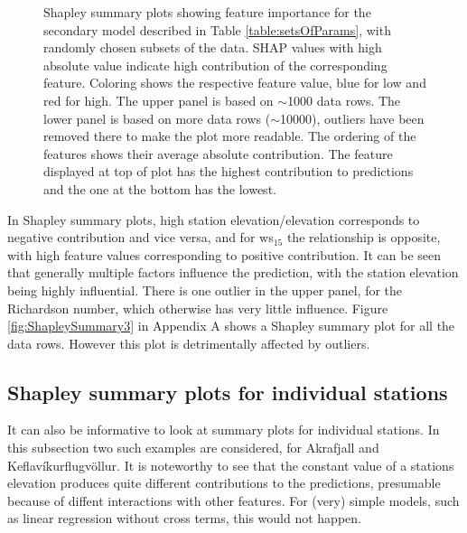 \begin{figure}
\begin{subfigure}{0.85\textwidth}
    \label{fig:ShapleySummaryLargerSet}
  \end{subfigure}
  \caption[Shapley summary plots]{Shapley summary plots showing feature importance for the secondary model described in Table \ref{table:setsOfParams}, with randomly chosen subsets of the data. SHAP values with high absolute value indicate high contribution of the corresponding feature. Coloring shows the respective feature value, blue for low and red for high. The upper panel is based on $\sim$1000 data rows. The lower panel is based on more data rows ($\sim$10000), outliers have been removed there to make the plot more readable. The ordering of the features shows their average absolute contribution. The feature displayed at top of plot has the highest contribution to predictions and the one at the bottom has the lowest.}
  \label{fig:ShapleySummary}
\end{figure}

In Shapley summary plots, high station elevation/elevation corresponds to negative contribution and vice versa, and for ws$_{15}$ the relationship is opposite, with high feature values corresponding to positive contribution. It can be seen that generally multiple factors influence the prediction, with the station elevation being highly influential. There is one outlier in the upper panel, for the Richardson number, which otherwise has very little influence.
Figure \ref{fig:ShapleySummary3} in Appendix A shows a Shapley summary plot for all the data rows. However this plot is detrimentally affected by outliers.

\subsection{Shapley summary plots for individual stations}
It can also be informative to look at summary plots for individual stations. In this subsection two such examples are considered, for Akrafjall and Keflavíkurflugvöllur. It is noteworthy to see that the constant value of a stations elevation produces quite different contributions to the predictions, presumable because of diffent interactions with other features. For (very) simple models, such as linear regression without cross terms, this would not happen.

